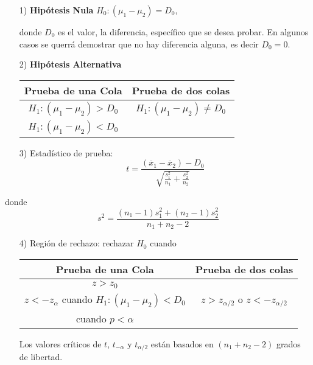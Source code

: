 \begin{frame}
\begin{frame}
\begin{Note}
\end{Note}

\begin{itemize}
\item[1) ] \textbf{Hip\'otesis Nula} $H_{0}:\left(\mu_{1}-\mu_{2}\right)=D_{0}$,\medskip

donde $D_{0}$ es el valor, la diferencia, espec\'ifico que se desea probar. En algunos casos se querr\'a demostrar que no hay diferencia alguna, es decir $D_{0}=0$.

\item[2) ] \textbf{Hip\'otesis Alternativa}
\begin{tabular}{cc}\hline
\textbf{Prueba de una Cola} & \textbf{Prueba de dos colas}\\\hline
$H_{1}:\left(\mu_{1}-\mu_{2}\right)>D_{0}$ & $H_{1}:\left(\mu_{1}-\mu_{2}\right)\neq D_{0}$\\ 
$H_{1}:\left(\mu_{1}-\mu_{2}\right)<D_{0}$&\\
\end{tabular}

\item[3) ] Estad\'istico de prueba:
$$t=\frac{\left(\overline{x}_{1}-\overline{x}_{2}\right)-D_{0}}{\sqrt{\frac{s^{2}_{1}}{n_{1}}+\frac{s^{2}_{2}}{n_{2}}}}$$
\end{itemize}







donde $$s^{2}=\frac{\left(n_{1}-1\right)s_{1}^{2}+\left(n_{2}-1\right)s_{2}^{2}}{n_{1}+n_{2}-2}$$
\begin{itemize}

\item[4) ] Regi\'on de rechazo: rechazar $H_{0}$ cuando
\begin{tabular}{cc}\hline
\textbf{Prueba de una Cola} & \textbf{Prueba de dos colas}\\\hline
$z>z_{0}$ & \\
$z<-z_{\alpha}$ cuando $H_{1}:\left(\mu_{1}-\mu_{2}\right)<D_{0}$&$z>z_{\alpha/2}$ o $z<-z_{\alpha/2}$\\
 cuando $p<\alpha$&\\
\end{tabular}
Los valores cr\'iticos de $t$, $t_{-\alpha}$ y $t_{\alpha/2}$ est\'an basados en $\left(n_{1}+n_{2}-2\right)$ grados de libertad.


\end{itemize}







\end{frame}
\end{frame}
